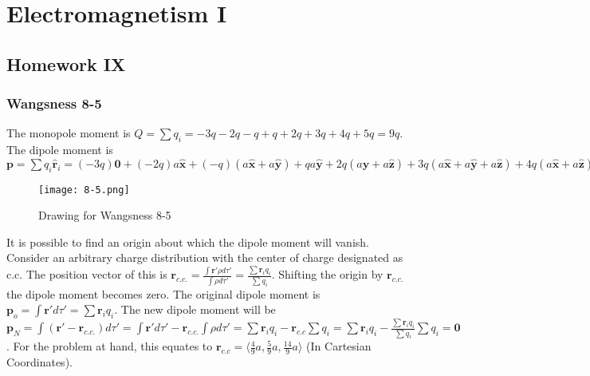 \documentclass[crop=false,class=article,oneside]{standalone}
\begin{document}
    \ifx\ifphysicscourseselectromagnetismI\undefined
        \section*{Electromagnetism I}
        \setcounter{section}{9}
        \renewcommand\thesubfigure{%
            \arabic{section}.\arabic{figure}.\arabic{subfigure}%
        }
    \fi 
    \subsection{Homework IX}
        \subsubsection{Wangsness 8-5}
        The monopole moment is $Q = \sum q_i = -3q-2q-q+q+2q+3q+4q+5q=9q$.
        The dipole moment is $\mathbf{p} = \sum q_i \hat{\mathbf{r}}_i = (-3q)\mathbf{0} + (-2q)a\hat{\mathbf{x}} + (-q)(a\hat{\mathbf{x}}+a\hat{\mathbf{y}})+qa\hat{\mathbf{y}} + 2q(a\hat{\mathbf{y}}+a\hat{\mathbf{z}})+3q(a\hat{\mathbf{x}}+a\hat{\mathbf{y}}+a\hat{\mathbf{z}})+4q(a\hat{\mathbf{x}}+a\hat{\mathbf{z}})+5qa\hat{\mathbf{z}}=4qa\hat{\mathbf{x}}+5qa\hat{\mathbf{y}}+14aq\hat{\mathbf{z}}$
        \begin{figure}[htbp]
            \centering
            {\texttt{[image: 8-5.png]}}
            \caption{Drawing for Wangsness 8-5}
        \end{figure}
        It is possible to find an origin about which the dipole moment will vanish. Consider an arbitrary charge distribution with the center of charge designated as c.c. The position vector of this is $\mathbf{r}_{c.c.} = \frac{\int \mathbf{r}' \rho d\tau '}{\int \rho d\tau '} = \frac{\sum \mathbf{r}_i q_i}{\sum q_i}$. Shifting the origin by $\mathbf{r}_{c.c.}$ the dipole moment becomes zero. The original dipole moment is $\mathbf{p}_{o} = \int \mathbf{r}' d\tau ' = \sum \mathbf{r}_i q_i$. The new dipole moment will be $\mathbf{p}_N = \int (\mathbf{r}' - \mathbf{r}_{c.c.})d\tau' = \int \mathbf{r}' d\tau' - \mathbf{r}_{c.c.} \int \rho d\tau' = \sum \mathbf{r}_i q_i - \mathbf{r}_{c.c} \sum q_i = \sum \mathbf{r}_i q_i - \frac{\sum \mathbf{r}_i q_i }{\sum q_i}\sum q_i = \mathbf{0}$. For the problem at hand, this equates to $\mathbf{r}_{c.c} = \langle \frac{4}{9}a, \frac{5}{9}a, \frac{14}{9}a\rangle$ (In Cartesian Coordinates).
        \begin{problem}[Wangsness 8-8]
        \end{problem}
\end{document}
